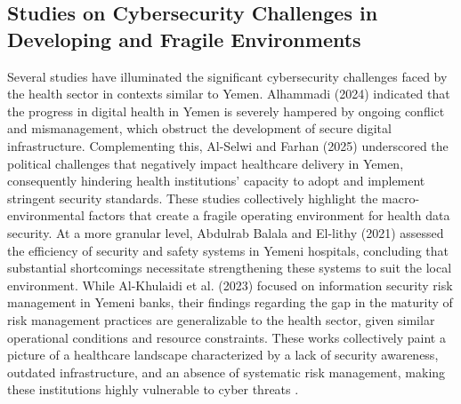 \documentclass[12pt, a4paper, oneside]{report}
\begin{document}
	\subsection{ Studies on Cybersecurity Challenges in Developing and Fragile Environments}
	Several studies have illuminated the significant cybersecurity challenges faced by the health sector in contexts similar to Yemen. Alhammadi (2024) \cite{alhammadi2024advancing} indicated that the progress in digital health in Yemen is severely hampered by ongoing conflict and mismanagement, which obstruct the development of secure digital infrastructure. Complementing this, Al-Selwi and Farhan (2025) \cite{al2025political} underscored the political challenges that negatively impact healthcare delivery in Yemen, consequently hindering health institutions' capacity to adopt and implement stringent security standards. These studies collectively highlight the macro-environmental factors that create a fragile operating environment for health data security.
	At a more granular level, Abdulrab Balala and El-lithy (2021) \cite{abdulrab2021assessing} assessed the efficiency of security and safety systems in Yemeni hospitals, concluding that substantial shortcomings necessitate strengthening these systems to suit the local environment. While Al-Khulaidi et al. (2023) \cite{al2023information} focused on information security risk management in Yemeni banks, their findings regarding the gap in the maturity of risk management practices are generalizable to the health sector, given similar operational conditions and resource constraints. These works collectively paint a picture of a healthcare landscape characterized by a lack of security awareness, outdated infrastructure, and an absence of systematic risk management, making these institutions highly vulnerable to cyber threats \cite{alhammadi2024advancing} \cite{abdulrab2021assessing} \cite{al2025political} \cite{al2023information}.
\end{document}
